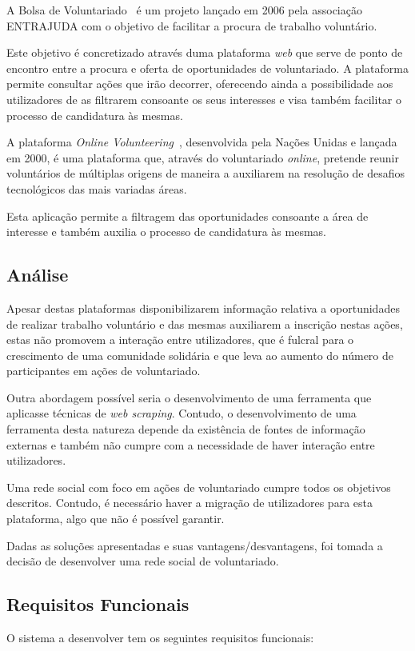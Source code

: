 A Bolsa de Voluntariado~\cite{Entrajuda2006} é um projeto lançado em 2006 pela associação ENTRAJUDA com o objetivo de facilitar a procura de trabalho voluntário. \medskip

Este objetivo é concretizado através duma plataforma \textit{web} que serve de ponto de encontro entre a procura e oferta de oportunidades de voluntariado. A plataforma permite consultar ações que irão decorrer, oferecendo ainda a possibilidade aos utilizadores de as filtrarem consoante os seus interesses e visa também facilitar o processo de candidatura às mesmas. \medskip

A plataforma \textit{Online Volunteering}~\cite{UniNations}, desenvolvida pela Nações Unidas e lançada em 2000, é uma plataforma que, através do voluntariado \textit{online}, pretende reunir voluntários de múltiplas origens de maneira a auxiliarem na resolução de desafios tecnológicos das mais variadas áreas. \medskip

Esta aplicação permite a filtragem das oportunidades consoante a área de interesse e também auxilia o processo de candidatura às mesmas. 

\subsection{Análise}

Apesar destas plataformas disponibilizarem informação relativa a oportunidades de realizar trabalho voluntário e das mesmas auxiliarem a inscrição nestas ações, estas não promovem a interação entre utilizadores, que é fulcral para o crescimento de uma comunidade solidária e que leva ao aumento do número de participantes em ações de voluntariado. \medskip

Outra abordagem possível seria o desenvolvimento de uma ferramenta que aplicasse técnicas de \textit{web scraping}. Contudo, o desenvolvimento de uma ferramenta desta natureza depende da existência de fontes de informação externas e também não cumpre com a necessidade de haver interação entre utilizadores. \medskip

Uma rede social com foco em ações de voluntariado cumpre todos os objetivos descritos. Contudo, é necessário haver a migração de utilizadores para esta plataforma, algo que não é possível garantir. \medskip

Dadas as soluções apresentadas e suas vantagens/desvantagens, foi tomada a decisão de desenvolver uma rede social de voluntariado.

\subsection{Requisitos Funcionais}
O sistema a desenvolver tem os seguintes requisitos funcionais:

